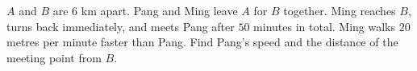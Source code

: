 $A$ and $B$ are $6$ km apart. Pang and Ming leave $A$ for $B$ together. Ming reaches $B$, turns back immediately, and meets Pang after $50$ minutes in total. Ming walks $20$ metres per minute faster than Pang. Find Pang's speed and the distance of the meeting point from $B$.
